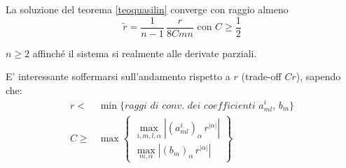 \begin{theorem}\label{stimaraggio}
La soluzione del teorema \ref{teoquasilin} converge con raggio almeno
$$\widetilde{r} = \dfrac{1}{n-1}\, \dfrac{r}{8Cmn} \text{ con } C \geq \frac{1}{2}$$
\end{theorem}
\begin{remark}
$n \geq 2$ affinché il sistema si realmente alle derivate parziali. 
\end{remark}
\begin{remark}
E' interessante soffermarsi sull'andamento rispetto a $r$ (trade-off $Cr$), sapendo che:
\begin{align}\label{r}
r <& \min \{ \textit{raggi di conv. dei coefficienti } a^i_{ml}, \, b_m\} \\
\label{C}
C \geq & \max \begin{Bmatrix}
\max\limits_{i,m,l,\alpha } \left| (a^i_{ml})_\alpha \, r^{|\alpha |}\right|\\
\max\limits_{m,\alpha} \left|(b_m)_\alpha \, r^{|\alpha |}\right|
\end{Bmatrix}
\end{align}
\end{remark}


